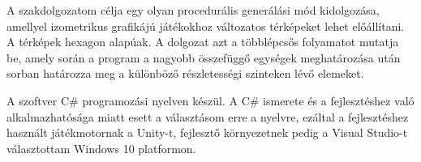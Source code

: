 
A szakdolgozatom célja egy olyan procedurális generálási mód kidolgozása, amellyel izometrikus grafikájú játékokhoz változatos térképeket lehet előállítani. A térképek hexagon alapúak. A dolgozat azt a többlépcsős folyamatot mutatja be, amely során a program a nagyobb összefüggő egységek meghatározása után sorban határozza meg a különböző részletességi szinteken lévő elemeket.

A szoftver C\# programozási nyelven készül. A C\# ismerete és a fejlesztéshez való alkalmazhatósága miatt esett a választásom erre a nyelvre, ezáltal a fejlesztéshez használt játékmotornak a Unity-t, fejlesztő környezetnek pedig a Visual Studio-t választottam Windows 10 platformon.

